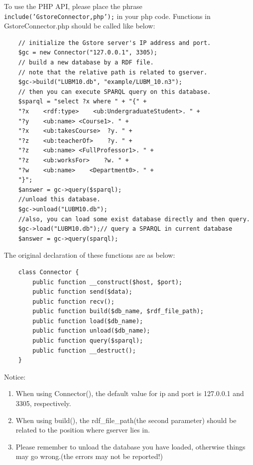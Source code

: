 \documentclass[titlepage, a4paper, 12pt]{article}
\begin{document}
	
	
	To use the PHP API, please place the phrase
\texttt{include('GstoreConnector,php');} in your php code. Functions in
GstoreConnector.php should be called like below:
	
	\begin{verbatim}
	// initialize the Gstore server's IP address and port.
	$gc = new Connector("127.0.0.1", 3305);
	// build a new database by a RDF file.
	// note that the relative path is related to gserver.
	$gc->build("LUBM10.db", "example/LUBM_10.n3");
	// then you can execute SPARQL query on this database.
	$sparql = "select ?x where " + "{" +
	"?x    <rdf:type>    <ub:UndergraduateStudent>. " +
	"?y    <ub:name> <Course1>. " +
	"?x    <ub:takesCourse>  ?y. " +
	"?z    <ub:teacherOf>    ?y. " +
	"?z    <ub:name> <FullProfessor1>. " +
	"?z    <ub:worksFor>    ?w. " +
	"?w    <ub:name>    <Department0>. " +
	"}";
	$answer = gc->query($sparql);
	//unload this database.
	$gc->unload("LUBM10.db");
	//also, you can load some exist database directly and then query.
	$gc->load("LUBM10.db");// query a SPARQL in current database
	$answer = gc->query(sparql);
	\end{verbatim}
	
	The original declaration of these functions are as below:
	
	\begin{verbatim}
	class Connector {
		public function __construct($host, $port);
		public function send($data);
		public function recv();
		public function build($db_name, $rdf_file_path);
		public function load($db_name);
		public function unload($db_name);
		public function query($sparql);
		public function __destruct();
	}
	\end{verbatim}
	
	Notice:
	
	\begin{enumerate}
		\item
		When using Connector(), the default value for ip and port is
		127.0.0.1 and 3305, respectively.
		\item
		When using build(), the rdf\_file\_path(the second parameter) should
		be related to the position where gserver lies in.
		\item
		Please remember to unload the database you have loaded, otherwise
		things may go wrong.(the errors may not be reported!)
	\end{enumerate}
	
\end{document}

